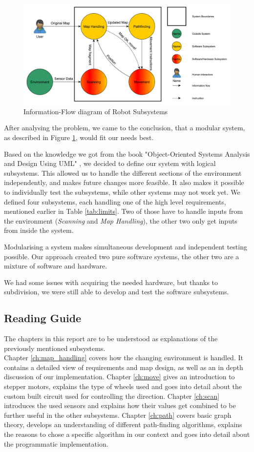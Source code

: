 \begin{figure}[!ht]
	\centering
	\includegraphics[width=\textwidth]{figures/intro/systemview}
	\caption{Information-Flow diagram of Robot Subsystems}
	\label{fig:system} 
\end{figure}
After analysing the problem,
we came to the conclusion,
that a modular system,
as described in Figure \ref{fig:system},
would fit our needs best.

Based on the knowledge we got from the book
"Object-Oriented Systems Analysis and Design  Using UML" \cite{Benett2010},
we decided to define our system with logical subsystems.
This allowed us to handle the different sections of the environment independently,
and makes future changes more feasible.
It also makes it possible to individually test the subsystems,
while other systems may not work yet.
We defined four subsystems, each handling one of the high level requirements,
mentioned earlier in Table \ref{tab:limits}.
Two of those have to handle inputs from the environment (\emph{Scanning} and \emph{Map Handling}),
the other two only get inputs from inside the system.

Modularising a system makes simultaneous development
and independent testing possible.
Our approach created two pure software systems,
the other two are a mixture of software and hardware.

We had some issues with acquiring the needed hardware,
but thanks to subdivision,
we were still able to develop and test the software subsystems.

\subsection*{Reading Guide}
The chapters in this report are to be understood as explanations of the previously mentioned subsystems.\\
Chapter \ref{ch:map_handling} covers how the changing environment is handled.
It contains a detailed view of requirements and map design,
as well as an in depth discussion of our implementation.
Chapter \ref{ch:move} gives an introduction to stepper motors, explains the type of wheels used and goes into detail about the custom built circuit used for controlling the direction.
Chapter \ref{ch:scan} introduces the used sensors and 
explains how their values get combined to be further useful in the other subsystems.
Chapter \ref{ch:path} covers basic graph theory,
develops an understanding of different path-finding algorithms,
explains the reasons to chose a specific algorithm in our context and
goes into detail about the programmatic implementation.
